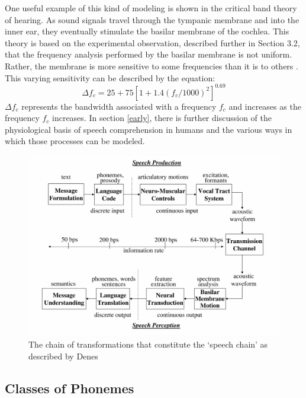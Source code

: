 \documentclass[titlepage]{article}
\begin{document}
    One useful example of this kind of modeling is shown in the critical band theory of hearing.
    As sound signals travel through the tympanic membrane and into the inner ear, they
    eventually stimulate the basilar membrane of the cochlea.
    This theory is based on the experimental observation, described further in Section 3.2,
    that the frequency analysis performed
    by the basilar membrane is not uniform. Rather, the membrane is more sensitive
    to some frequencies than it is to others
    \cite{Fastl2007,Rabiner2007}. This varying sensitivity can be described by the equation:
    \begin{equation} \label{eq:1}
      \Delta f_c=25+75[1+1.4(f_c/1000)^2]^{0.69}
    \end{equation}
    $\Delta f_c$ represents the bandwidth associated with a frequency $f_c$ and increases
    as the frequency $f_c$ increases.
    In section \ref{early}, there is further discussion of the physiological
    basis of speech comprehension in
    humans and the various ways in which those processes can be modeled.



    \begin{figure}
      \centering
      \includegraphics[scale=0.3]{speechChain}
      \caption{The chain of transformations that constitute the `speech chain' as
      described by Denes \cite{Denes1993,Rabiner2007}}
      \label{speechChain}
    \end{figure}

  \subsection{Classes of Phonemes}
\end{document}
